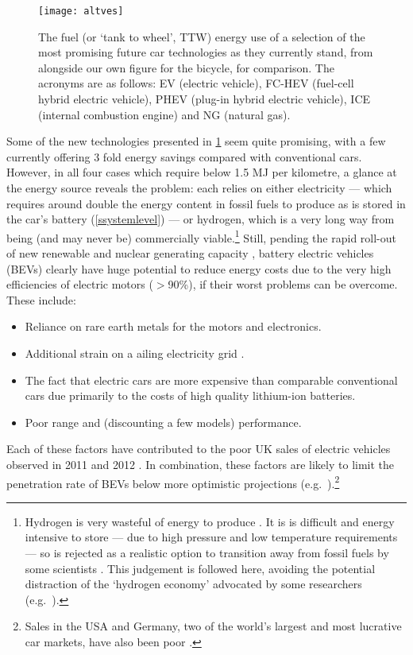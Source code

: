 \begin{figure}
 \texttt{[image: altves]}
 \caption[Fuel energy use of future car technologies]
 {The fuel (or `tank to wheel', TTW) energy use of a selection of
 the most promising future car technologies as they currently stand, from
 \citet{Baptista2012} alongside our own figure for the bicycle, for comparison.
 The acronyms are
 as follows: EV (electric vehicle), FC-HEV (fuel-cell hybrid electric vehicle),
 PHEV (plug-in hybrid electric vehicle), ICE (internal combustion engine) and
 NG (natural gas).} \label{faltves}
\end{figure}

Some of the new technologies presented in \cref{faltves} seem quite promising,
with a few currently offering 3 fold energy savings compared with conventional
cars. However, in all four cases which require below 1.5 MJ per kilometre, a
glance at the energy source reveals the problem: each relies on either
electricity --- which requires around double
the energy content in fossil fuels to produce as is stored in the car's
battery (\cref{ssystemlevel})
--- or hydrogen, which is a very long way from being (and may never be)
commercially viable.\footnote{Hydrogen
is very wasteful of energy to produce \citep{Smil2008}. It is
is difficult and energy intensive to store --- due to high pressure and low temperature
requirements --- so is rejected as a realistic option to transition away from
fossil fuels by some scientists \citep{MacKay2009, kreith2004fallacies}.
This judgement is followed here, avoiding the potential distraction of the
`hydrogen economy' advocated by some researchers (e.g.~\citealp{Kleijn2010}).
}
Still, pending the rapid roll-out of new renewable and nuclear generating
capacity \citep{dyke2010impact},
battery electric vehicles (BEVs) clearly have huge
potential to reduce energy costs due to the very high efficiencies of
electric motors ($>$90\%), if their worst problems can be overcome.
These include:
\begin{itemize}
 \item Reliance on rare earth metals for the motors and electronics.
 \item Additional strain on a ailing electricity grid \citep{dyke2010impact,
 webster1999can}.
 \item The fact that electric cars are
more expensive than comparable conventional cars due primarily to the costs of
high quality lithium-ion batteries.
\item Poor range and (discounting a few models) performance.
\end{itemize}
Each of these factors have contributed to
the poor UK sales of electric vehicles observed in 2011
\citep{AdamVaughan2011} and 2012 \citep{DavidCornis, Massey2013elecmail}.
In combination, these factors are likely to limit the penetration rate of BEVs below
more optimistic projections (e.g.~\citealp{Shepherd2012}).\footnote{Sales
in the USA and Germany, two of the world's largest and most lucrative car
markets, have also been poor \citep{Hepker, Mihalascu}.}

